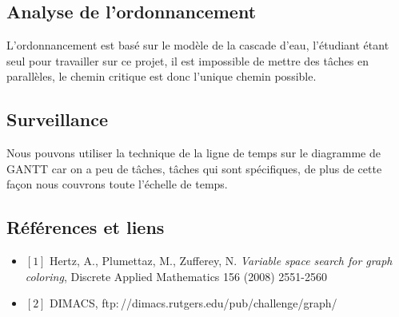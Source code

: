 \documentclass[runningheads]{llncs}
\begin{document}
\subsection{Analyse de l'ordonnancement}

L'ordonnancement est basé sur le modèle de la cascade d'eau, l'étudiant étant seul pour travailler sur ce projet, il est 
impossible de mettre des tâches en parallèles, le chemin critique est donc l'unique chemin possible.

\subsection{Surveillance}

Nous pouvons utiliser la technique de la ligne de temps sur le diagramme de GANTT car on a peu de tâches, tâches qui sont 
spécifiques, de plus de cette façon nous couvrons toute l'échelle de temps. 





\newpage
\subsection{Références et liens}
\begin{itemize}
\item $[1]$ Hertz, A., Plumettaz, M., Zufferey, N. \textit{Variable space search for graph coloring}, Discrete Applied Mathematics 
156 (2008) 2551-2560
\item $[2]$ DIMACS, ftp$:$//dimacs.rutgers.edu/pub/challenge/graph/
\end{itemize}
\end{document}
